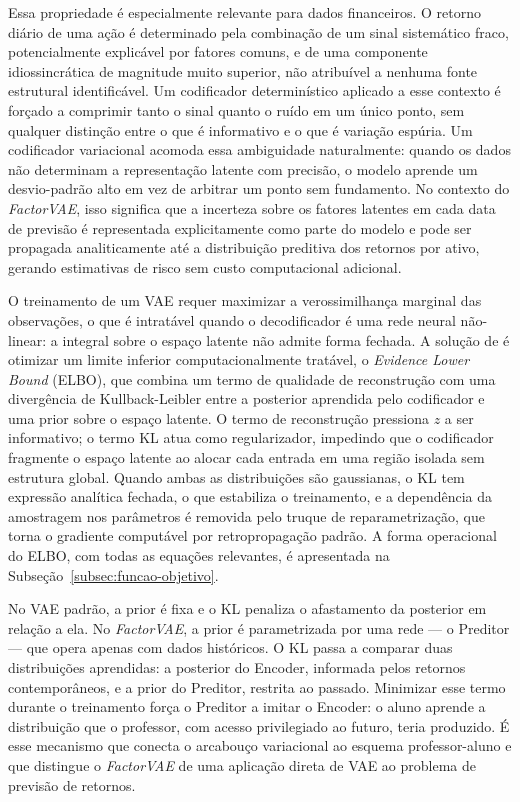 Essa propriedade é especialmente relevante para dados financeiros. O retorno diário de
uma ação é determinado pela combinação de um sinal sistemático fraco, potencialmente
explicável por fatores comuns, e de uma componente idiossincrática de magnitude muito
superior, não atribuível a nenhuma fonte estrutural identificável. Um codificador
determinístico aplicado a esse contexto é forçado a comprimir tanto o sinal quanto o
ruído em um único ponto, sem qualquer distinção entre o que é informativo e o que é
variação espúria. Um codificador variacional acomoda essa ambiguidade naturalmente:
quando os dados não determinam a representação latente com precisão, o modelo aprende
um desvio-padrão alto em vez de arbitrar um ponto sem fundamento. No contexto do
\textit{FactorVAE}, isso significa que a incerteza sobre os fatores latentes em cada
data de previsão é representada explicitamente como parte do modelo e pode ser
propagada analiticamente até a distribuição preditiva dos retornos por ativo, gerando
estimativas de risco sem custo computacional adicional.

O treinamento de um VAE requer maximizar a verossimilhança marginal das observações,
o que é intratável quando o decodificador é uma rede neural não-linear: a integral
sobre o espaço latente não admite forma fechada. A solução de \textcite{kingma2014}
é otimizar um limite inferior computacionalmente tratável, o \textit{Evidence Lower
Bound} (ELBO), que combina um termo de qualidade de reconstrução com uma divergência
de Kullback-Leibler entre a posterior aprendida pelo codificador e uma prior sobre o
espaço latente. O termo de reconstrução pressiona $z$ a ser informativo; o termo KL
atua como regularizador, impedindo que o codificador fragmente o espaço latente ao
alocar cada entrada em uma região isolada sem estrutura global. Quando ambas as
distribuições são gaussianas, o KL tem expressão analítica fechada, o que estabiliza
o treinamento, e a dependência da amostragem nos parâmetros é removida pelo truque
de reparametrização, que torna o gradiente computável por retropropagação padrão. A
forma operacional do ELBO, com todas as equações relevantes, é apresentada na
Subseção~\ref{subsec:funcao-objetivo}.

No VAE padrão, a prior é fixa e o KL penaliza o afastamento da posterior em relação
a ela. No \textit{FactorVAE}, a prior é parametrizada por uma rede --- o Preditor
--- que opera apenas com dados históricos. O KL passa a comparar duas distribuições
aprendidas: a posterior do Encoder, informada pelos retornos contemporâneos, e a
prior do Preditor, restrita ao passado. Minimizar esse termo durante o treinamento
força o Preditor a imitar o Encoder: o aluno aprende a distribuição que o professor,
com acesso privilegiado ao futuro, teria produzido. É esse mecanismo que conecta o
arcabouço variacional ao esquema professor-aluno e que distingue o
\textit{FactorVAE} de uma aplicação direta de VAE ao problema de previsão de
retornos.


